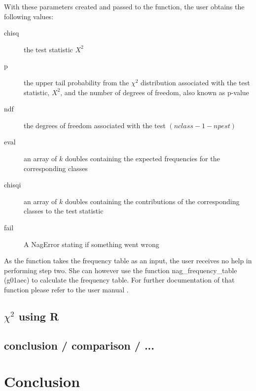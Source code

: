 \documentclass{article}
\begin{document}
With these parameters created and passed to the function, the user obtains the following values:
\begin{description}
	\item[chisq] the test statistic $X^2$
	\item[p] the upper tail probability from the $\chi^2$ distribution associated with the test statistic, $X^2$, and the number of degrees of freedom, also known as p-value
	\item[ndf] the degrees of freedom associated with the test $(nclass-1-npest)$
	\item[eval] an array of $k$ doubles containing the expected frequencies for the corresponding classes
	\item[chisqi] an array of $k$ doubles containing the contributions of the corresponding classes to the test statistic
	\item[fail] A NagError stating if something went wrong
\end{description}
As the function takes the frequency table as an input, the user receives no help in performing step two.
She can however use the function nag\_frequency\_table (g01aec) to calculate the frequency table.
For further documentation of that function please refer to the user manual \cite{nagc}.

\subsection{$\chi^2$ using R}

\subsection{conclusion / comparison / ...}


\section{Conclusion}


\newpage
\nocite{*}


\end{document}
